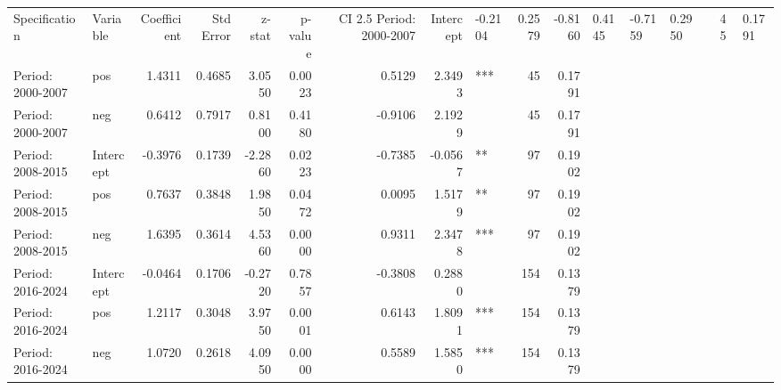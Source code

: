 \begin{tabular}{llrrrrrrlrr}
\toprule
Specification & Variable & Coefficient & Std Error & z-stat & p-value & CI 2.5%
\midrule
Period: 2000-2007 & Intercept & -0.2104 & 0.2579 & -0.8160 & 0.4145 & -0.7159 & 0.2950 &  & 45 & 0.1791 \\
Period: 2000-2007 & pos & 1.4311 & 0.4685 & 3.0550 & 0.0023 & 0.5129 & 2.3493 & *** & 45 & 0.1791 \\
Period: 2000-2007 & neg & 0.6412 & 0.7917 & 0.8100 & 0.4180 & -0.9106 & 2.1929 &  & 45 & 0.1791 \\
Period: 2008-2015 & Intercept & -0.3976 & 0.1739 & -2.2860 & 0.0223 & -0.7385 & -0.0567 & ** & 97 & 0.1902 \\
Period: 2008-2015 & pos & 0.7637 & 0.3848 & 1.9850 & 0.0472 & 0.0095 & 1.5179 & ** & 97 & 0.1902 \\
Period: 2008-2015 & neg & 1.6395 & 0.3614 & 4.5360 & 0.0000 & 0.9311 & 2.3478 & *** & 97 & 0.1902 \\
Period: 2016-2024 & Intercept & -0.0464 & 0.1706 & -0.2720 & 0.7857 & -0.3808 & 0.2880 &  & 154 & 0.1379 \\
Period: 2016-2024 & pos & 1.2117 & 0.3048 & 3.9750 & 0.0001 & 0.6143 & 1.8091 & *** & 154 & 0.1379 \\
Period: 2016-2024 & neg & 1.0720 & 0.2618 & 4.0950 & 0.0000 & 0.5589 & 1.5850 & *** & 154 & 0.1379 \\
\bottomrule
\end{tabular}

